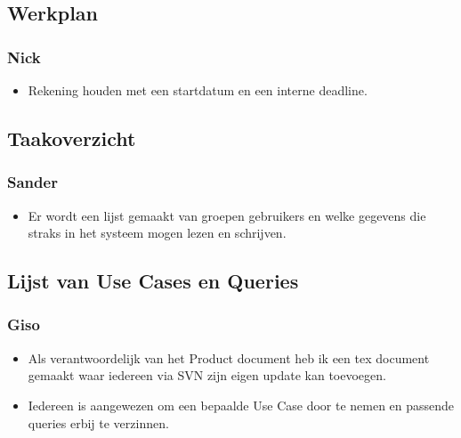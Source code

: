 
\subsection*{Werkplan}
\subsubsection*{Nick}
\begin{itemize}
\item Rekening houden met een startdatum en een interne deadline.
\end{itemize}

\subsection*{Taakoverzicht}
\subsubsection*{Sander}
\begin{itemize}
\item Er wordt een lijst gemaakt van groepen gebruikers en welke gegevens die straks in het systeem mogen lezen en schrijven.
\end{itemize}

\subsection*{Lijst van Use Cases en Queries}
\subsubsection*{Giso}
\begin{itemize}
\item Als verantwoordelijk van het Product document heb ik een tex
document gemaakt waar iedereen via SVN zijn eigen update kan
toevoegen.
\item Iedereen is aangewezen om een bepaalde Use Case door te nemen
en passende queries erbij te verzinnen.
\end{itemize}
